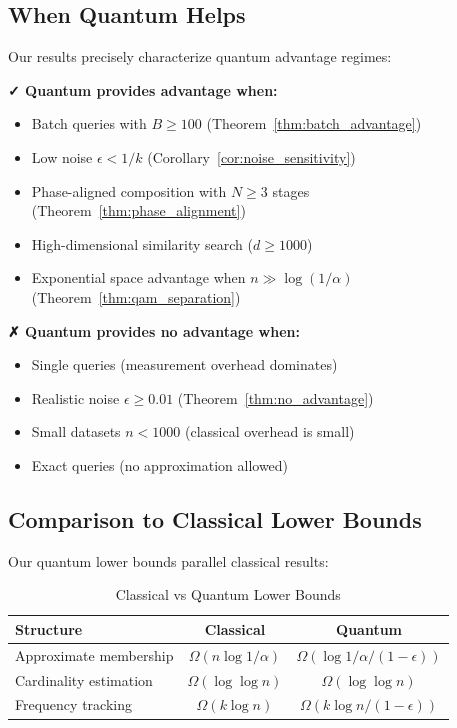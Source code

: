\documentclass[11pt,letterpaper]{article}
\begin{document}
\subsection{When Quantum Helps}

Our results precisely characterize quantum advantage regimes:

\textbf{✓ Quantum provides advantage when:}
\begin{itemize}
\item Batch queries with $B \geq 100$ (Theorem~\ref{thm:batch_advantage})
\item Low noise $\epsilon < 1/k$ (Corollary~\ref{cor:noise_sensitivity})
\item Phase-aligned composition with $N \geq 3$ stages (Theorem~\ref{thm:phase_alignment})
\item High-dimensional similarity search ($d \geq 1000$)
\item Exponential space advantage when $n \gg \log(1/\alpha)$ (Theorem~\ref{thm:qam_separation})
\end{itemize}

\textbf{✗ Quantum provides no advantage when:}
\begin{itemize}
\item Single queries (measurement overhead dominates)
\item Realistic noise $\epsilon \geq 0.01$ (Theorem~\ref{thm:no_advantage})
\item Small datasets $n < 1000$ (classical overhead is small)
\item Exact queries (no approximation allowed)
\end{itemize}

\subsection{Comparison to Classical Lower Bounds}

Our quantum lower bounds parallel classical results:

\begin{table}[ht]
\centering
\caption{Classical vs Quantum Lower Bounds}
\begin{tabular}{lcc}
\toprule
\textbf{Structure} & \textbf{Classical} & \textbf{Quantum} \\
\midrule
Approximate membership & $\Omega(n \log 1/\alpha)$ & $\Omega(\log 1/\alpha / (1-\epsilon))$ \\
Cardinality estimation & $\Omega(\log \log n)$ & $\Omega(\log \log n)$ \\
Frequency tracking & $\Omega(k \log n)$ & $\Omega(k \log n / (1-\epsilon))$ \\
\bottomrule
\end{tabular}
\end{table}
\end{document}
